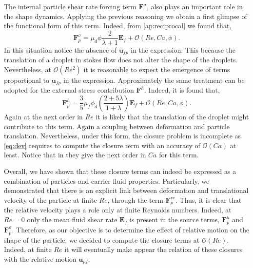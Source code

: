 The internal particle shear rate forcing term $\textbf{F}^\sigma$, also plays an important role in the shape dynamics. 
Applying the previous reasoning we obtain a first glimpse of the functional form of this term. 
Indeed, from \ref{ap:reciprocal} we found that, 
\begin{equation*}
    \textbf{F}_p^{\sigma}
    = \mu_d \phi \frac{ 2 }{\lambda+1}
    \textbf{E}_f
    + \mathcal{O}(Re,Ca,\phi). 
\end{equation*}
In this situation notice the absence of $\textbf{u}_{fp}$ in the expression.
This because the translation of a droplet in stokes flow does not alter the shape of the droplets. 
Nevertheless, at $\mathcal{O}(Re^2)$ it is reasonable to expect the emergence of terms proportional to $\textbf{u}_{fp}$ in the expression.
Approximately the same treatment can be adopted for the external stress contribution $\textbf{F}^h$. 
Indeed, it is found that, 
\begin{equation}
    \textbf{F}^h_p
    = 
    \frac{3}{5}\mu_f \phi_d \left(\frac{2+5\lambda}{1+\lambda}\right)
    \textbf{E}_f
    + \mathcal{O}(Re,Ca,\phi).
    \label{eq:closure_stress}
\end{equation}
Again at the next order in $Re$ it is likely that the translation of the droplet might contribute to this term. 
Again a coupling between deformation and particle translation. 
Nevertheless, under this form, the closure problem is incomplete as \ref{eq:dev} requires to compute the closure term with an accuracy of $\mathcal{O}(Ca)$ at least. 
Notice that in \citet{raja2010inertial} they give the next order in $Ca$ for this term.


Overall, we have shown that these closure terms can indeed be expressed as a combination of particles and carrier fluid properties.
Particularly, we demonstrated that there is an explicit link between deformation and translational velocity of the particle at finite $Re$, through the term $\textbf{F}^{vv}_p$. 
Thus, it is clear that the relative velocity plays a role only at finite Reynolds numbers. 
Indeed, at $Re = 0$ only the mean fluid shear rate $\textbf{E}_f$ is present in the source terms, $\textbf{F}^h_p$ and $\textbf{F}_p^{\sigma}$. 
Therefore, as our objective is to determine the effect of relative motion on the shape of the particle, we decided to compute the closure terms at $\mathcal{O}(Re)$. 
Indeed, at finite $Re$ it will eventually make appear the relation of these closures with the relative motion $\textbf{u}_{pf}$. 


